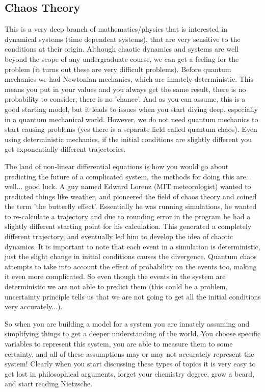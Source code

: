 \documentclass{article}
\begin{document}
\subsection{Chaos Theory}
This is a very deep branch of mathematics/physics that is interested in dynamical systems (time dependent systems), that are very sensitive to the conditions at their origin. 
Although chaotic dynamics and systems are well beyond the scope of any undergraduate course, we can get a feeling for the problem (it turns out these are very difficult problems).
Before quantum mechanics we had Newtonian mechanics, which are innately deterministic. 
This means you put in your values and you always get the same result, there is no probability to consider, there is no 'chance'. 
And as you can assume, this is a good starting model, but it leads to issues when you start diving deep, especially in a quantum mechanical world.
However, we do not need quantum mechanics to start causing problems (yes there is a separate field called quantum chaos). 
Even using deterministic mechanics, if the initial conditions are slightly different you get exponentially different trajectories. 

The land of non-linear differential equations is how you would go about predicting the future of a complicated system, the methods for doing this are... well... good luck. 
A guy named Edward Lorenz (MIT meteorologist) wanted to predicted things like weather, and pioneered the field of chaos theory and coined the term 'the butterfly effect'. 
Essentially he was running simulations, he wanted to re-calculate a trajectory and due to rounding error in  the program he had a slightly different starting point for his calculation. 
This generated a completely different trajectory, and eventually led him to develop the idea of chaotic dynamics. 
It is important to note that each event in a simulation is deterministic, just the slight change in initial conditions causes the divergence. 
Quantum chaos attempts to take into account the effect of probability on the events too, making it even more complicated.
So even though the events in the system are deterministic we are not able to predict them (this could be a problem, uncertainty principle tells us that we are not going to get all the initial conditions very accurately...).

So when you are building a model for a system you are innately assuming and simplifying things to get a deeper understanding of the world. 
You choose specific variables to represent this system, you are able to measure them to some certainty, and all of these assumptions may or may not accurately represent the system!
Clearly when you start discussing these types of topics it is very easy to get lost in philosophical arguments, forget your chemistry degree, grow a beard, and start reading Nietzsche. 
\end{document}
